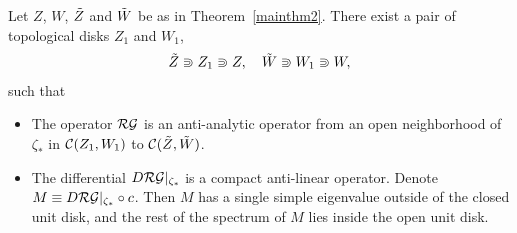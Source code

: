 \begin{thm}\label{mainthm3} Let $Z$, $W$, $\tilde Z$ and $\tilde W$ be as in Theorem~\ref{mainthm2}. There exist a pair of topological disks $Z_1$ and $W_1$,
\begin{equation} \label{eq:ZWs}
\tilde Z\Supset Z_1 \Supset Z, \quad \tilde W \Supset W_1 \Supset W,
\end{equation}
such that
\begin{itemize}
\item[$(i)$]   The operator $\mathcal{RG}$ is an anti-analytic operator from an open neighborhood of $\zeta_*$ in $\mathcal{C}(Z_1,W_1)$ to $\mathcal{C}(\tilde Z, \tilde W)$. 
\item[$(ii)$]  The differential $D \mathcal{RG} \arrowvert_{\zeta_*}$ is a compact anti-linear operator. Denote $M\equiv D {\mathcal{RG}} \arrowvert_{\zeta_*}\circ c$. Then $M$ has a single simple eigenvalue outside of the closed unit disk, and the rest of the spectrum of $M$ lies inside the open unit disk.
\end{itemize}
\end{thm}

